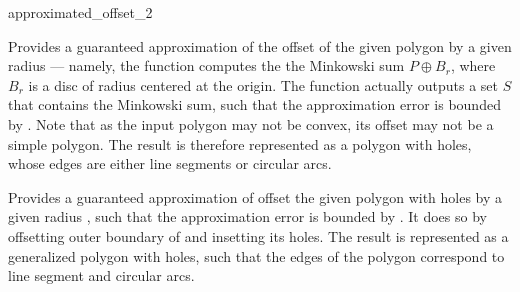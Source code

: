 
\ccRefPageBegin

\begin{ccRefFunction}{approximated_offset_2}


   {Provides a guaranteed approximation of the offset of the given polygon
     by a given radius  --- namely, the function computes the
    the Minkowski sum $P \oplus B_r$, where $B_r$ is a disc of radius
     centered at the origin.
    The function actually outputs a set $S$ that contains the Minkowski sum,
    such that the approximation error is bounded by .
    Note that as the input polygon may not be convex, its offset may not be a
    simple polygon. The result is therefore represented as a polygon with
    holes, whose edges are either line segments or circular arcs.
    }

   {Provides a guaranteed approximation of offset the given polygon with holes
     by a given radius , such that the approximation error is bounded
    by . It does so by offsetting outer boundary of  and insetting
    its holes.
    The result is represented as a generalized polygon with holes, such that the edges
    of the polygon correspond to line segment and circular arcs.
    }



\end{ccRefFunction}
